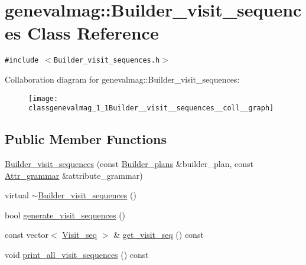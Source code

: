 \hypertarget{classgenevalmag_1_1Builder__visit__sequences}{
\section{genevalmag::Builder\_\-visit\_\-sequences Class Reference}
\label{classgenevalmag_1_1Builder__visit__sequences}
}
{\tt \#include $<$Builder\_\-visit\_\-sequences.h$>$}

Collaboration diagram for genevalmag::Builder\_\-visit\_\-sequences:\nopagebreak
\begin{figure}[H]
\begin{center}
\leavevmode
\texttt{[image: classgenevalmag\_1\_1Builder\_\_visit\_\_sequences\_\_coll\_\_graph]}
\end{center}
\end{figure}
\subsection*{Public Member Functions}
\begin{CompactItemize}
\item 
\hyperlink{classgenevalmag_1_1Builder__visit__sequences_14404a9245e81db0b848226b33c4705c}{Builder\_\-visit\_\-sequences} (const \hyperlink{classgenevalmag_1_1Builder__plans}{Builder\_\-plans} \&builder\_\-plan, const \hyperlink{classgenevalmag_1_1Attr__grammar}{Attr\_\-grammar} \&attribute\_\-grammar)
\item 
virtual \hyperlink{classgenevalmag_1_1Builder__visit__sequences_9b86db069a7c5564cf802bef80599a7d}{$\sim$Builder\_\-visit\_\-sequences} ()
\item 
bool \hyperlink{classgenevalmag_1_1Builder__visit__sequences_2721134ffe1c2677b96a46c4b4d184ef}{generate\_\-visit\_\-sequences} ()
\item 
const vector$<$ \hyperlink{namespacegenevalmag_7720677d79b33ecca4db21cdbcf7908f}{Visit\_\-seq} $>$ \& \hyperlink{classgenevalmag_1_1Builder__visit__sequences_cf3c542e09500da73d78ddc757f136ec}{get\_\-visit\_\-seq} () const 
\item 
void \hyperlink{classgenevalmag_1_1Builder__visit__sequences_d3073f1a763bdbd4812f64a16bb6a67d}{print\_\-all\_\-visit\_\-sequences} () const 
\end{CompactItemize}
